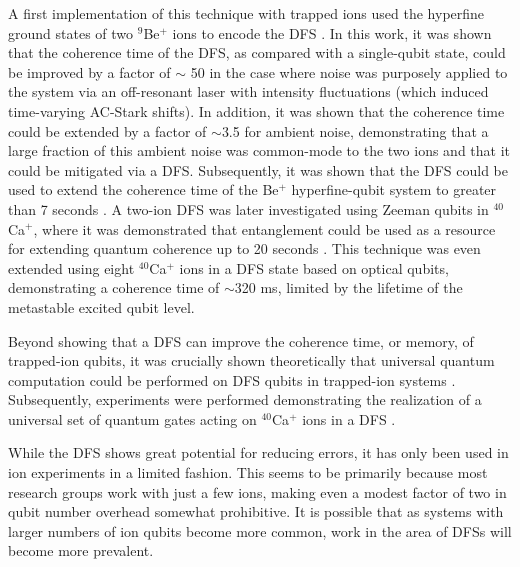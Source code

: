 \documentclass[%
reprint,
 amsmath,amssymb,
]{revtex4-1}
\begin{document}
A first implementation of this technique with trapped ions used the hyperfine ground states of two $^9$Be$^+$ ions to encode the DFS \cite{KielpinskiDFS1013}.  In this work, it was shown that the coherence time of the DFS, as compared with a single-qubit state, could be improved by a factor of $\sim$ 50 in the case where noise was purposely applied to the system via an off-resonant laser with intensity fluctuations (which induced time-varying AC-Stark shifts).  In addition, it was shown that the coherence time could be extended by a factor of $\sim$3.5 for ambient noise, demonstrating that a large fraction of this ambient noise was common-mode to the two ions and that it could be mitigated via a DFS. Subsequently, it was shown that the DFS could be used to extend the coherence time of the Be$^+$ hyperfine-qubit system to greater than 7 seconds \cite{langer2005long}. A two-ion DFS was later investigated using Zeeman qubits in $^{40}$Ca$^+$, where it was demonstrated that entanglement could be used as a resource for extending quantum coherence up to 20 seconds \cite{HaeffnerRobustEntanglement2005}.  This technique was even extended using eight $^{40}$Ca$^+$ ions in a DFS state based on optical qubits, demonstrating a coherence time of $\sim$320 ms, limited by the lifetime of the metastable excited qubit level.

Beyond showing that a DFS can improve the coherence time, or memory, of trapped-ion qubits, it was crucially shown theoretically that universal quantum computation could be performed on DFS qubits in trapped-ion systems \cite{AolitaDFS2007, CenDFS2006}.  Subsequently, experiments were performed demonstrating the realization of a universal set of quantum gates acting on $^{40}$Ca$^+$ ions in a DFS \cite{MonzDFSGates2009}.

While the DFS shows great potential for reducing errors, it has only been used in ion experiments in a limited fashion.  This seems to be primarily because most research groups work with just a few ions, making even a modest factor of two in qubit number overhead somewhat prohibitive.  It is possible that as systems with larger numbers of ion qubits become more common, work in the area of DFSs will become more prevalent.
\end{document}
